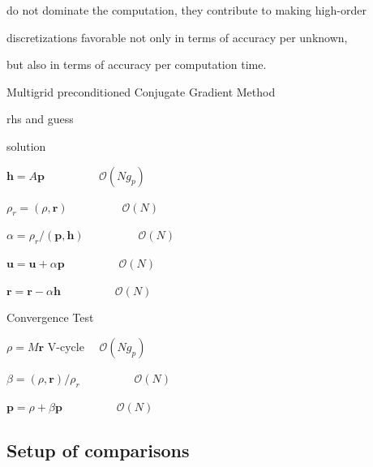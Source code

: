 \documentclass[smallcondensed,final]{svjour3}     %
\newcommand{\bs}[1]{\ensuremath{\boldsymbol #1}}
\begin{document}
do not dominate the computation, they contribute to making high-order

discretizations favorable not only in terms of accuracy per unknown,

but also in terms of accuracy per computation time.



\begin{algorithm}[ht] 


  \caption{Multigrid preconditioned Conjugate Gradient Method} \label{alg:pcg} 

  \begin{algorithmic}[1]

    \Require rhs and guess

    \Ensure  solution


    \State $\bs{h} = A \bs{p}$ 											\Comment $~~\quad\quad\quad\quad\mathcal{O}(Ng_p)$

    \State $\rho_r = (\rho, \bs{r})$								\Comment $~~\quad\quad\quad\quad\mathcal{O}(N)~~~$

    \State $\alpha = \rho_r / ( \bs{p}, \bs{h} )$		\Comment $~~\quad\quad\quad\quad\mathcal{O}(N)~~~$

    \State $\bs{u} = \bs{u} + \alpha\bs{p}$					\Comment $~~\quad\quad\quad\quad\mathcal{O}(N)~~~$

    \State $\bs{r} = \bs{r} - \alpha\bs{h}$					\Comment $~~\quad\quad\quad\quad\mathcal{O}(N)~~~$

    \State Convergence Test

    \State $\rho = M\bs{r}$ 												\Comment V-cycle $\quad\mathcal{O}(Ng_p)$

    \State $\beta = (\rho, \bs{r}) / \rho_r$				\Comment $~~\quad\quad\quad\quad\mathcal{O}(N)~~~$

    \State $\bs{p} = \rho + \beta\bs{p}$						\Comment $~~\quad\quad\quad\quad\mathcal{O}(N)~~~$

    \EndWhile

  \end{algorithmic}

\end{algorithm}







\subsection{Setup of comparisons}\label{subsec:measures}
\end{document}
